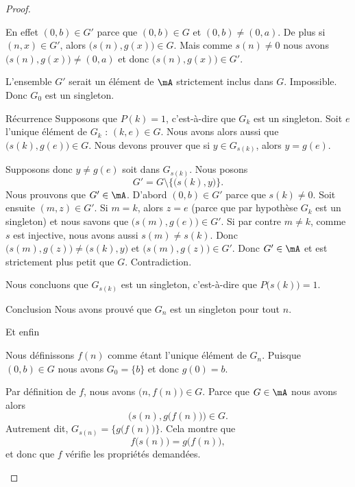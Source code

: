 \begin{proof}
\begin{subproof}
\begin{subproof}
    En effet \( (0,b)\in G'\) parce que \( (0,b)\in G\) et \( (0,b)\neq (0,a)\). De plus si \( (n,x)\in G'\), alors \( \big( s(n),g(x) \big)\in G\). Mais comme \( s(n)\neq 0\) nous avons \( \big( s(n),g(x) \big)\neq (0,a)\) et donc \( \big( s(n),g(x) \big)\in G'\).

    L'ensemble \( G'\) serait un élément de \( \mA\) strictement inclus dans \( G\). Impossible. Donc \( G_0\) est un singleton.

\item[Récurrence]
    Supposons que \( P(k)=1\), c'est-à-dire que \( G_k\) est un singleton. Soit \( e\) l'unique élément de \( G_k\) : \( (k,e)\in G\). Nous avons alors aussi que \( \big( s(k),g(e) \big)\in G\). Nous devons prouver que si \( y\in G_{s(k)}\), alors \( y=g(e)\).

    Supposons donc \( y\neq g(e)\) soit dans \( G_{s(k)}\). Nous posons
    \begin{equation}
        G'=G\setminus\{ \big( s(k),y \big) \}.
    \end{equation}
    Nous prouvons que \( G'\in\mA\). D'abord \( (0,b)\in G'\) parce que \( s(k)\neq 0\). Soit ensuite \( (m,z)\in G'\). Si \( m=k\), alors \( z=e\) (parce que par hypothèse \( G_k\) est un singleton) et nous savons que \( \big( s(m),g(e) \big)\in G'\). Si par contre \( m\neq k\), comme  \( s\) est injective, nous avons aussi \( s(m)\neq s(k)\). Donc \( \big( s(m),g(z) \big)\neq \big( s(k),y \big)\) et \( \big( s(m),g(z) \big)\in G'\). Donc \( G'\in \mA\) et est strictement plus petit que \( G\). Contradiction.

    Nous concluons que \( G_{s(k)}\) est un singleton, c'est-à-dire que \( P\big( s(k) \big)=1\).
\item[Conclusion]
    Nous avons prouvé que \( G_n\) est un singleton pour tout \( n\).
    \end{subproof}
    
\item[Et enfin]

    Nous définissons \( f(n)\) comme étant l'unique élément de \( G_n\). Puisque \( (0,b)\in G\) nous avons \( G_0=\{ b \}\) et donc \( g(0)=b\).

    Par définition de \( f\), nous avons \( \big( n,f(n) \big)\in G\). Parce que \( G\in\mA\) nous avons alors
    \begin{equation}
        \big( s(n),g\big( f(n) \big) \big)\in G.
    \end{equation}
    Autrement dit, \( G_{s(n)}= \{  g\big( f(n) \big) \}\). Cela montre que 
    \begin{equation}
        f\big( s(n) \big)=g\big( f(n) \big),
    \end{equation}
    et donc que \( f\) vérifie les propriétés demandées.
    \end{subproof}
\end{proof}

